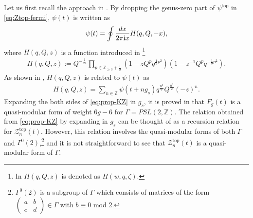 \documentclass[11pt]{article}
\newcommand{\ri}{{\rm i}}
\newcommand{\hf}{\frac{1}{2}}
\def\Ga{\Gamma}
\newcommand{\Ztop}{\mathcal{Z}^{\text{top}}}
\renewcommand{\[}{\begin{eqnarray}}
\renewcommand{\]}{\end{eqnarray}}
\newcommand{\bbZ}{{\mathbb Z}}
\begin{document}
Let us first recall the approach in \cite{zagier}.
By dropping the genus-zero part of $\psi^{\text{top}}$ in \eqref{eq:Ztop-fermi},
$\psi(t)$ is written as
\begin{align}
 \psi(t)=\oint\frac{dx}{2\pi\ri x}H(q,Q,-x),
\end{align}
where $H(q,Q,z)$ is a function introduced in \cite{zagier}\footnote{In \cite{zagier}
$H(q,Q,z)$ is denoted as $H(w,q,\zeta)$.}
\begin{align}
 H(q,Q,z):=Q^{-\frac{1}{24}}\prod_{p\in\bbZ_{\geq0}+\hf}(1-zQ^pq^{\hf p^2})(1-z^{-1}Q^pq^{-\hf p^2}).
\end{align}
As shown in \cite{zagier}, $H(q,Q,z)$ is related to
$\psi(t)$ as
\begin{align}
 H(q,Q,z)
=\sum_{n\in\bbZ}
  \psi(t+n g_s)q^{\frac{n^3}{6}}Q^{\frac{n^2}{2}}(-z)^n.
\label{eq:prop-KZ}
\end{align}
Expanding the both sides of \eqref{eq:prop-KZ} in $g_s$,
it is proved in \cite{zagier}
that $F_g(t)$ is a quasi-modular form
of weight $6g-6$ for $\Ga=PSL(2,\bbZ)$.
The relation obtained from \eqref{eq:prop-KZ} by expanding in $g_s$
can be thought of as a recursion relation for $\Ztop_n(t)$.
However, this relation involves the quasi-modular forms of 
both $\Ga$ and $\Ga^0(2)$,\footnote{$\Gamma^0(2)$ is
a subgroup of $\Gamma$ which consists of matrices of the form
$
\begin{pmatrix}
 a&b\\c&d
\end{pmatrix}\in\Gamma
$
with $b\equiv 0$ mod $2$.} and it is not straightforward to
see that
$\Ztop_n(t)$ is a quasi-modular form of $\Ga$.
\end{document}
